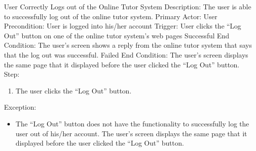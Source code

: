     \begin{section}{User Correctly Logs out of the Online Tutor System}
        Description: The user is able to successfully log out of the online tutor system. \newline
        Primary Actor: User \newline
        Precondition: User is logged into his/her account \newline 
        Trigger: User clicks the “Log Out” button on one of the online tutor system’s web pages \newline
        Successful End Condition: The user’s screen shows a reply from the online tutor system that says that the log out was successful. \newline
        Failed End Condition: The user’s screen displays the same page that it displayed before the user clicked the “Log Out” button. \newline
        \newline
        Step:
        \begin{enumerate}
            \item{The user clicks the “Log Out” button.}
        \end{enumerate}
        Exception:
        \begin{itemize}
            \item{The “Log Out” button does not have the functionality to successfully log the user out of his/her account.  The user’s screen displays the same page that it displayed before the user clicked the “Log Out” button.}
        \end{itemize}
    \end{section}
    
